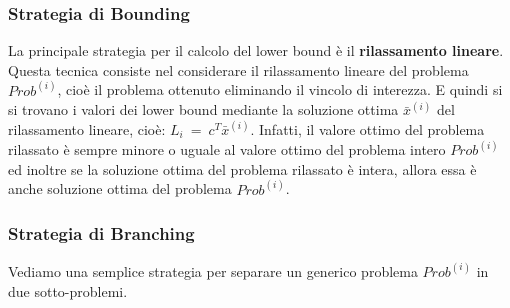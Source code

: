 \subsubsection*{Strategia di Bounding}
La principale strategia per il calcolo del lower bound è il \textbf{rilassamento lineare}. Questa tecnica consiste nel considerare il rilassamento lineare del problema $Prob^{(i)}$, cioè il problema ottenuto eliminando il vincolo di interezza.
E quindi si si trovano i valori dei lower bound mediante la soluzione ottima $\bar{x}^{(i)}$ del rilassamento lineare, cioè: $L_i ~ = ~ c^T \bar{x}^{(i)}$.
Infatti, il valore ottimo del problema rilassato è sempre minore o uguale al valore ottimo del problema intero $Prob^{(i)}$ ed inoltre se la soluzione ottima del problema rilassato è intera, allora essa è anche soluzione ottima del problema $Prob^{(i)}$.

\subsubsection*{Strategia di Branching}
Vediamo una semplice strategia per separare un generico problema $Prob^{(i)}$ in due sotto-problemi. 

